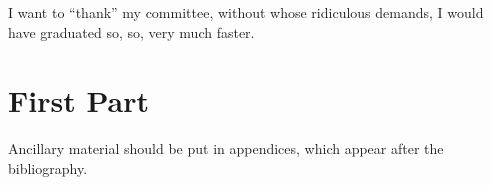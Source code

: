 \documentclass[11pt]{ucthesis}
\begin{document}
\begin{frontmatter}
\begin{acknowledgements}
I want to ``thank'' my committee, without whose ridiculous demands, I
would have graduated so, so, very much faster.
\end{acknowledgements}

\end{frontmatter}

\part{First Part}














\nocite{*}



\appendix


Ancillary material should be put in appendices, which appear after the
bibliography. 
\end{document}
